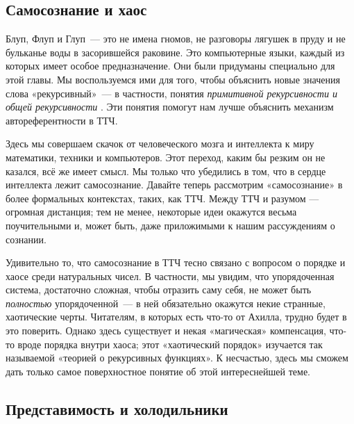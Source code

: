 \documentclass[../main.tex]{subfiles}
\begin{document}

\subsection{Самосознание и хаос}

Блуп, Флуп и Глуп~--- это не имена гномов, не разговоры лягушек в пруду и не бульканье воды в засорившейся раковине. Это компьютерные языки, каждый из которых имеет особое предназначение. Они были придуманы специально для этой главы. Мы воспользуемся ими для того, чтобы объяснить новые значения слова «рекурсивный»~--- в частности, понятия \emph{примитивной рекурсивности и общей рекурсивности} . Эти понятия помогут нам лучше объяснить механизм автореферентности в ТТЧ.

Здесь мы совершаем скачок от человеческого мозга и интеллекта к миру математики, техники и компьютеров. Этот переход, каким бы резким он не казался, всё же имеет смысл. Мы только что убедились в том, что в сердце интеллекта лежит самосознание. Давайте теперь рассмотрим «самосознание» в более формальных контекстах, таких, как ТТЧ\@. Между ТТЧ и разумом --- огромная дистанция; тем не менее, некоторые идеи окажутся весьма поучительными и, может быть, даже приложимыми к нашим рассуждениям о сознании.

Удивительно то, что самосознание в ТТЧ тесно связано с вопросом о порядке и хаосе среди натуральных чисел. В частности, мы увидим, что упорядоченная система, достаточно сложная, чтобы отразить саму себя, не может быть \emph{полностью} упорядоченной~--- в ней обязательно окажутся некие странные, хаотические черты. Читателям, в которых есть что-то от Ахилла, трудно будет в это поверить. Однако здесь существует и некая «магическая» компенсация, что-то вроде порядка внутри хаоса; этот «хаотический порядок» изучается так называемой «теорией о рекурсивных функциях». К несчастью, здесь мы сможем дать только самое поверхностное понятие об этой интереснейшей теме.


\subsection{Представимость и холодильники}
\end{document}
